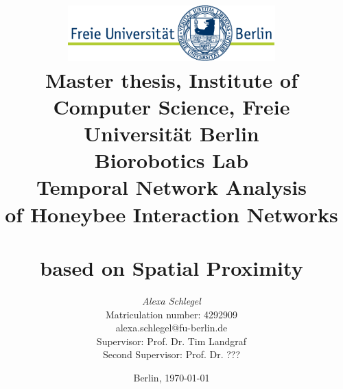 %
\begin{titlepage}

\title{\includegraphics[width=0.6\textwidth]{Resources/FU_logo.pdf}\\
{\small Master thesis, Institute of Computer Science, Freie Universität Berlin}\\
{\small Biorobotics Lab}\\
[6ex]
{\LARGE Temporal Network Analysis\\ of Honeybee Interaction Networks\\ } \\
{\normalsize based on Spatial Proximity }}

\author{
{\emph{\normalsize Alexa Schlegel}}\\
{\normalsize Matriculation number: 4292909}\\
{\normalsize alexa.schlegel@fu-berlin.de}\\ 
[15ex]   
{\normalsize Supervisor: Prof. Dr. Tim Landgraf}\\
{\normalsize Second Supervisor: Prof. Dr. ???}\\
}
\vspace{6ex}
\date{\normalsize Berlin, \today}
 
\maketitle  

\end{titlepage}